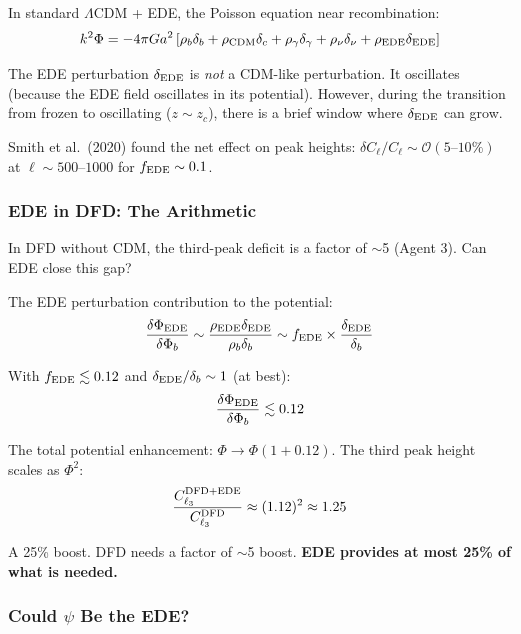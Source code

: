 \documentclass[11pt,a4paper]{article}
\begin{document}
In standard $\Lambda$CDM + EDE, the Poisson equation near recombination:
\begin{equation}
k^2\Phi = -4\pi G a^2\left[\rho_b\delta_b + \rho_{\rm CDM}\delta_c + \rho_\gamma\delta_\gamma + \rho_\nu\delta_\nu + \rho_{\rm EDE}\delta_{\rm EDE}\right]
\end{equation}

The EDE perturbation $\delta_{\rm EDE}$ is \emph{not} a CDM-like perturbation. It oscillates (because the EDE field oscillates in its potential). However, during the transition from frozen to oscillating ($z \sim z_c$), there is a brief window where $\delta_{\rm EDE}$ can grow.

Smith et al.\ (2020) found the net effect on peak heights: $\delta C_\ell/C_\ell \sim \mathcal{O}(5\text{--}10\%)$ at $\ell \sim 500$--$1000$ for $f_{\rm EDE} \sim 0.1$.

\subsubsection{EDE in DFD: The Arithmetic}

In DFD without CDM, the third-peak deficit is a factor of $\sim$5 (Agent 3). Can EDE close this gap?

The EDE perturbation contribution to the potential:
\begin{equation}
\frac{\delta\Phi_{\rm EDE}}{\delta\Phi_b} \sim \frac{\rho_{\rm EDE}\delta_{\rm EDE}}{\rho_b\delta_b} \sim f_{\rm EDE} \times \frac{\delta_{\rm EDE}}{\delta_b}
\end{equation}

With $f_{\rm EDE} \lesssim 0.12$ and $\delta_{\rm EDE}/\delta_b \sim 1$ (at best):
\begin{equation}
\frac{\delta\Phi_{\rm EDE}}{\delta\Phi_b} \lesssim 0.12
\end{equation}

The total potential enhancement: $\Phi \to \Phi(1 + 0.12)$. The third peak height scales as $\Phi^2$:
\begin{equation}
\frac{C_{\ell_3}^{\rm DFD+EDE}}{C_{\ell_3}^{\rm DFD}} \approx (1.12)^2 \approx 1.25
\end{equation}

A 25\% boost. DFD needs a factor of $\sim$5 boost. \textbf{EDE provides at most 25\% of what is needed.}

\subsubsection{Could $\psi$ Be the EDE?}
\end{document}
